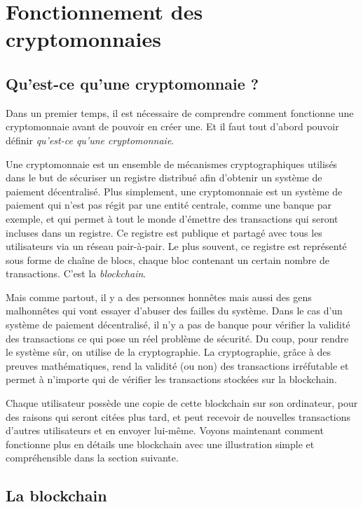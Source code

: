 \chapter{Fonctionnement des cryptomonnaies}
\label{ch:presentation}

\section{Qu'est-ce qu'une cryptomonnaie ?}

Dans un premier temps, il est nécessaire de comprendre comment fonctionne une cryptomonnaie avant de pouvoir en créer une. Et il faut tout d'abord pouvoir définir \emph{qu'est-ce qu'une cryptomonnaie}.

Une cryptomonnaie est un ensemble de mécanismes cryptographiques utilisés dans le but de sécuriser un registre distribué afin d'obtenir un système de paiement décentralisé. Plus simplement, une cryptomonnaie est un système de paiement qui n'est pas régit par une entité centrale, comme une banque par exemple, et qui permet à tout le monde d'émettre des transactions qui seront incluses dans un registre. Ce registre est publique et partagé avec tous les utilisateurs via un réseau pair-à-pair. Le plus souvent, ce registre est représenté sous forme de chaîne de blocs, chaque bloc contenant un certain nombre de transactions. C'est la \emph{blockchain}.

Mais comme partout, il y a des personnes honnêtes mais aussi des gens malhonnêtes qui vont essayer d'abuser des failles du système. Dans le cas d'un système de paiement décentralisé, il n'y a pas de banque pour vérifier la validité des transactions ce qui pose un réel problème de sécurité. Du coup, pour rendre le système sûr, on utilise de la cryptographie. La cryptographie, grâce à des preuves mathématiques, rend la validité (ou non) des transactions irréfutable et permet à n'importe qui de vérifier les transactions stockées sur la blockchain.

Chaque utilisateur possède une copie de cette blockchain sur son ordinateur, pour des raisons qui seront citées plus tard, et peut recevoir de nouvelles transactions d'autres utilisateurs et en envoyer lui-même. Voyons maintenant comment fonctionne plus en détails une blockchain avec une illustration simple et compréhensible dans la section suivante.

\section{La blockchain}

